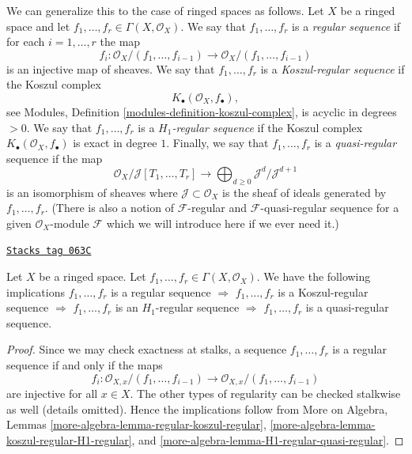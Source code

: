 \medskip\noindent
We can generalize this to the case of ringed spaces as follows.
Let $X$ be a ringed space and let
$f_1, \ldots, f_r \in \Gamma(X, \mathcal{O}_X)$.
We say that $f_1, \ldots, f_r$ is a {\it regular sequence} if
for each $i = 1, \ldots, r$ the map
\begin{equation}
\label{equation-map-regular}
f_i :
\mathcal{O}_X/(f_1, \ldots, f_{i - 1})
\longrightarrow
\mathcal{O}_X/(f_1, \ldots, f_{i - 1})
\end{equation}
is an injective map of sheaves. We say that $f_1, \ldots, f_r$ is a
{\it Koszul-regular sequence} if the Koszul complex
\begin{equation}
\label{equation-koszul}
K_\bullet(\mathcal{O}_X, f_\bullet),
\end{equation}
see
Modules, Definition \ref{modules-definition-koszul-complex},
is acyclic in degrees $> 0$. We say that $f_1, \ldots, f_r$ is a
{\it $H_1$-regular sequence} if the Koszul complex
$K_\bullet(\mathcal{O}_X, f_\bullet)$ is exact in degree $1$. Finally,
we say that $f_1, \ldots, f_r$ is a
{\it quasi-regular} sequence if the map
\begin{equation}
\label{equation-map-quasi-regular}
\mathcal{O}_X/\mathcal{J}[T_1, \ldots, T_r]
\longrightarrow
\bigoplus\nolimits_{d \geq 0} \mathcal{J}^d/\mathcal{J}^{d + 1}
\end{equation}
is an isomorphism of sheaves where $\mathcal{J} \subset \mathcal{O}_X$
is the sheaf of ideals generated by $f_1, \ldots, f_r$. (There is also
a notion of $\mathcal{F}$-regular and $\mathcal{F}$-quasi-regular sequence
for a given $\mathcal{O}_X$-module $\mathcal{F}$ which we will introduce
here if we ever need it.)

\begin{lemma}
\label{divisors-lemma-types-regular-sequences-implications}
\href{https://stacks.math.columbia.edu/tag/063C}{\texttt{Stacks tag 063C}}

Let $X$ be a ringed space.
Let $f_1, \ldots, f_r \in \Gamma(X, \mathcal{O}_X)$.
We have the following implications
$f_1, \ldots, f_r$ is a regular sequence $\Rightarrow$
$f_1, \ldots, f_r$ is a Koszul-regular sequence $\Rightarrow$
$f_1, \ldots, f_r$ is an $H_1$-regular sequence $\Rightarrow$
$f_1, \ldots, f_r$ is a quasi-regular sequence.
\end{lemma}

\begin{proof}
Since we may check exactness at stalks, a
sequence $f_1, \ldots, f_r$ is a regular sequence if and only
if the maps
$$
f_i :
\mathcal{O}_{X, x}/(f_1, \ldots, f_{i - 1})
\longrightarrow
\mathcal{O}_{X, x}/(f_1, \ldots, f_{i - 1})
$$
are injective for all $x \in X$. The other types of regularity
can be checked stalkwise as well (details omitted).
Hence the implications follow from More on Algebra, Lemmas
\ref{more-algebra-lemma-regular-koszul-regular},
\ref{more-algebra-lemma-koszul-regular-H1-regular}, and
\ref{more-algebra-lemma-H1-regular-quasi-regular}.
\end{proof}

